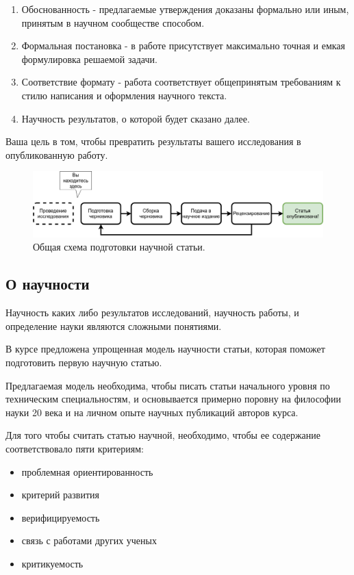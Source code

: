 \documentclass{report}
\begin{document}
\begin{enumerate}
	\item Обоснованность - предлагаемые утверждения доказаны формально или иным, принятым в научном сообществе способом.
	\item Формальная постановка - в работе присутствует максимально точная и емкая формулировка решаемой задачи.
	\item Соответствие формату - работа соответствует общепринятым требованиям к стилю написания и оформления научного текста.
	\item Научность результатов, о которой будет сказано далее.
\end{enumerate}

Ваша цель в том, чтобы превратить результаты вашего исследования в опубликованную работу.

\begin{figure}[H]
\centering
\includegraphics[width=13cm]{main_sheme}
\caption{Общая схема подготовки научной статьи.}
\end{figure}


\subsection{О научности}

Научность каких либо результатов исследований, научность работы, и определение науки являются сложными понятиями.

В курсе предложена упрощенная модель научности статьи, которая поможет подготовить первую научную статью.

Предлагаемая модель необходима, чтобы писать статьи начального уровня по техническим специальностям, и основывается примерно поровну на философии науки 20 века и на личном опыте научных публикаций авторов курса.

Для того чтобы считать статью научной, необходимо, чтобы ее содержание соответствовало пяти критериям:


\begin{itemize}
	\item проблемная ориентированность
	\item критерий развития
	\item верифицируемость
	\item связь с работами других ученых
	\item критикуемость
\end{itemize}
\end{document}
